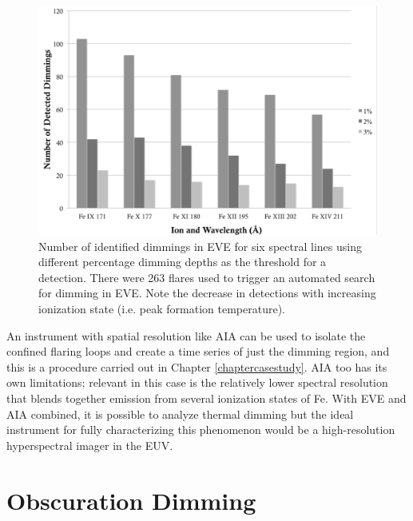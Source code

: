 \begin{figure}[!h]
    \caption[Dimming dependence on temperature in EVE]{
        Number of identified dimmings in EVE for six spectral lines using different percentage dimming depths as the
        threshold for a detection. There were 263 flares used to trigger an automated search for dimming in EVE. 
        Note the decrease in detections with increasing ionization state (i.e. peak formation temperature).
    }
    \begin{center}
        \includegraphics[width=150mm]{Images/DetectedDimmingVsIonization.png}
    \end{center}
    \label{detectedDimmingVsIonization}
\end{figure}

An instrument with spatial resolution like AIA can be used to isolate the confined flaring loops and create a time series of just the dimming region, and this is a procedure carried out in Chapter \ref{chaptercasestudy}. AIA too has its own limitations; relevant in this case is the relatively lower spectral resolution that blends together emission from several ionization states of Fe. With EVE and AIA combined, it is possible to analyze thermal dimming but the ideal instrument for fully characterizing this phenomenon would be a high-resolution hyperspectral imager in the EUV.

\section{Obscuration Dimming}

